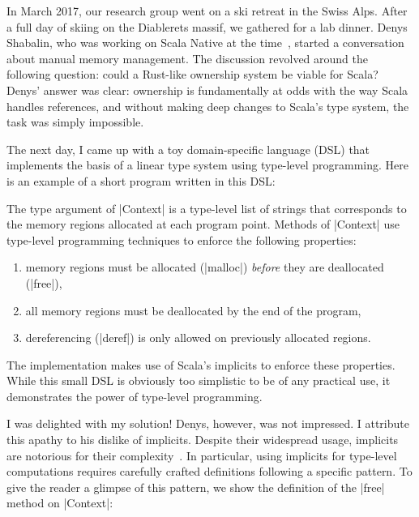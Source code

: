 In March 2017, our research group went on a ski retreat in the Swiss Alps.
After a full day of skiing on the Diablerets massif, we gathered for a lab dinner.
Denys Shabalin, who was working on Scala Native at the time~\citep{shabalin2020just}, started a conversation about manual memory management.
The discussion revolved around the following question: could a Rust-like ownership system be viable for Scala?
Denys' answer was clear: ownership is fundamentally at odds with the way Scala handles references, and without making deep changes to Scala's type system, the task was simply impossible.

The next day, I came up with a toy domain-specific language (DSL) that implements the basis of a linear type system using type-level programming.
Here is an example of a short program written in this DSL:

\memImplicitMain

\noindent
The type argument of |Context| is a type-level list of strings that corresponds to the memory regions allocated at each program point.
Methods of |Context| use type-level programming techniques to enforce the following properties:

\begin{enumerate}
  \item memory regions must be allocated (|malloc|) \emph{before} they are deallocated (|free|),
  \item all memory regions must be deallocated by the end of the program,
  \item dereferencing (|deref|) is only allowed on previously allocated regions.
\end{enumerate}

\noindent
The implementation makes use of Scala's implicits to enforce these properties.
While this small DSL is obviously too simplistic to be of any practical use, it demonstrates the power of type-level programming.

I was delighted with my solution!
Denys, however, was not impressed.
I attribute this apathy to his dislike of implicits.
Despite their widespread usage, implicits are notorious for their complexity~\citep{kvrikava2019scala}.
In particular, using implicits for type-level computations requires carefully crafted definitions following a specific pattern.
To give the reader a glimpse of this pattern, we show the definition of the |free| method on |Context|:

\memImplicitContextFree

